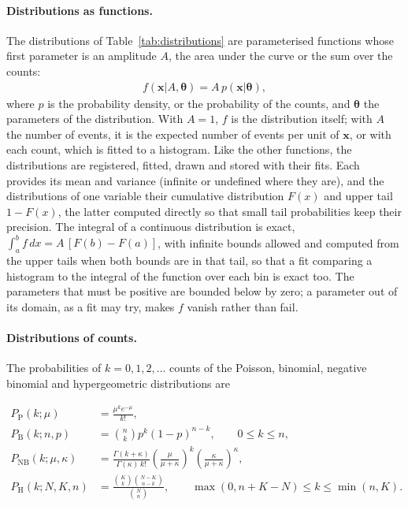 \paragraph{Distributions as functions.}
The distributions of Table~\ref{tab:distributions} are parameterised functions whose first parameter is an amplitude
$A$, the area under the curve or the sum over the counts:
\begin{align}
  f(\mathbf{x}| A, \boldsymbol{\theta}) = A\, p(\mathbf{x}|\boldsymbol{\theta}),
\end{align}
where $p$ is the probability density, or the probability of the counts, and $\boldsymbol{\theta}$ the parameters of
the distribution. With $A = 1$, $f$ is the distribution itself; with $A$ the number of events, it is the expected
number of events per unit of $\mathbf{x}$, or with each count, which is fitted to a histogram. Like the other
functions, the distributions are registered, fitted, drawn and stored with their fits. Each provides its mean and
variance (infinite or undefined where they are), and the distributions of one variable their cumulative distribution
$F(x)$ and upper tail $1 - F(x)$, the latter computed directly so that small tail probabilities keep their precision.
The integral of a continuous distribution is exact, $\int_a^b f\, dx = A\,[F(b) - F(a)]$, with infinite bounds
allowed and computed from the upper tails when both bounds are in that tail, so that a fit comparing a histogram to
the integral of the function over each bin is exact too. The parameters that must be positive are bounded below by
zero; a parameter out of its domain, as a fit may try, makes $f$ vanish rather than fail.



\paragraph{Distributions of counts.}
The probabilities of $k = 0, 1, 2, \dots$ counts of the Poisson, binomial, negative binomial and hypergeometric
distributions are
\begin{widetext}
\begin{align}
  P_{\mathrm{P}}(k;\mu) &= \frac{\mu^k e^{-\mu}}{k!}, \\
  P_{\mathrm{B}}(k;n,p) &= \binom{n}{k} p^k (1-p)^{n-k}, \qquad 0 \le k \le n, \\
  P_{\mathrm{NB}}(k;\mu,\kappa) &= \frac{\Gamma(k+\kappa)}{\Gamma(\kappa)\, k!}
     \left(\frac{\mu}{\mu+\kappa}\right)^{k} \left(\frac{\kappa}{\mu+\kappa}\right)^{\kappa}, \\
  P_{\mathrm{H}}(k;N,K,n) &= \frac{\binom{K}{k}\binom{N-K}{n-k}}{\binom{N}{n}}, \qquad
     \max(0, n+K-N) \le k \le \min(n, K).
\end{align}
\end{widetext}

